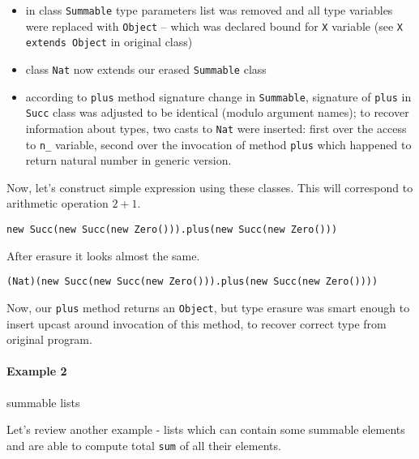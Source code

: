 \documentclass{article}[12pt]
\begin{document}
\begin{itemize}
\item in class \texttt{Summable} type parameters list was removed
   and all type variables were replaced with \texttt{Object} --
   which was declared bound for \texttt{X} variable (see
   \texttt{X extends Object} in original class)
\item class \texttt{Nat} now extends our erased \texttt{Summable}
  class
\item according to \texttt{plus} method signature change in
  \texttt{Summable}, signature of \texttt{plus} in \texttt{Succ}
  class was adjusted to be identical (modulo argument names);
  to recover information about types, two casts to \texttt{Nat}
  were inserted: first over the access to \texttt{n\_} variable,
  second over the invocation of method \texttt{plus} which
  happened to return natural number in generic version.
\end{itemize}
Now, let's construct simple expression using these classes. This
will correspond to arithmetic operation $2 + 1$.

\begin{verbatim}
new Succ(new Succ(new Zero())).plus(new Succ(new Zero()))
\end{verbatim}
After erasure it looks almost the same.
\begin{verbatim}
(Nat)(new Succ(new Succ(new Zero())).plus(new Succ(new Zero())))
\end{verbatim}

Now, our \texttt{plus} method returns an \texttt{Object}, but
type erasure was smart enough to insert upcast around invocation
of this method, to recover correct type from original program.

\paragraph{Example 2} summable lists

Let's review another example - lists which can contain some
summable elements and are able to compute total \texttt{sum} of
all their elements.
\end{document}
